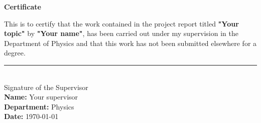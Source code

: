 \begin{center}
    \fontsize{20pt}{25pt}\selectfont
    \textbf{Certificate}
\end{center}

\vspace{1.5cm}

This is to certify that the work contained in the project report titled \textbf{"Your topic"} by \textbf{"Your name"}, has been carried out under my supervision in the Department of Physics and that this work has not been submitted elsewhere for a degree.

\vspace{2cm}

\parbox[t]{\textwidth}{
    \rule{0.4\linewidth}{0.5pt} \hfill \\[4pt]%
	Signature of the Supervisor \\[6pt]
	\textbf{Name:} Your supervisor \\
	\textbf{Department:} Physics \\
	\textbf{Date:} \today%
}